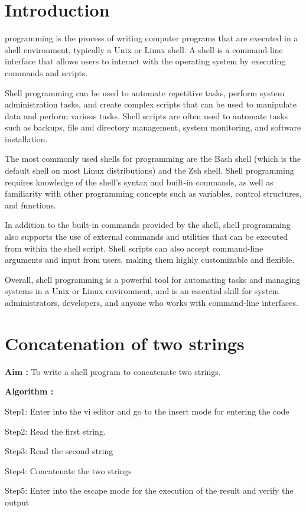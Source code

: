 \documentclass[journal,onecolumn]{IEEEtran}
\begin{document}
\IEEEpeerreviewmaketitle

\section{Introduction}
 programming is the process of writing computer programs that are executed in a shell environment, typically a Unix or Linux shell. A shell is a command-line interface that allows users to interact with the operating system by executing commands and scripts.

Shell programming can be used to automate repetitive tasks, perform system administration tasks, and create complex scripts that can be used to manipulate data and perform various tasks. Shell scripts are often used to automate tasks such as backups, file and directory management, system monitoring, and software installation.

The most commonly used shells for programming are the Bash shell (which is the default shell on most Linux distributions) and the Zsh shell. Shell programming requires knowledge of the shell's syntax and built-in commands, as well as familiarity with other programming concepts such as variables, control structures, and functions.

In addition to the built-in commands provided by the shell, shell programming also supports the use of external commands and utilities that can be executed from within the shell script. Shell scripts can also accept command-line arguments and input from users, making them highly customizable and flexible.

Overall, shell programming is a powerful tool for automating tasks and managing systems in a Unix or Linux environment, and is an essential skill for system administrators, developers, and anyone who works with command-line interfaces.





\section{Concatenation of two strings}
\textbf{Aim :} To write a shell program to concatenate two strings.

\textbf{Algorithm :}
\begin{list}{}{}
  \item Step1: Enter into the vi editor and go to the insert mode for entering the code
  \item Step2: Read the first string.
  \item Step3: Read the second string
  \item Step4: Concatenate the two strings
  \item Step5: Enter into the escape mode for the execution of the result and verify the output
\end{list}
\end{document}
